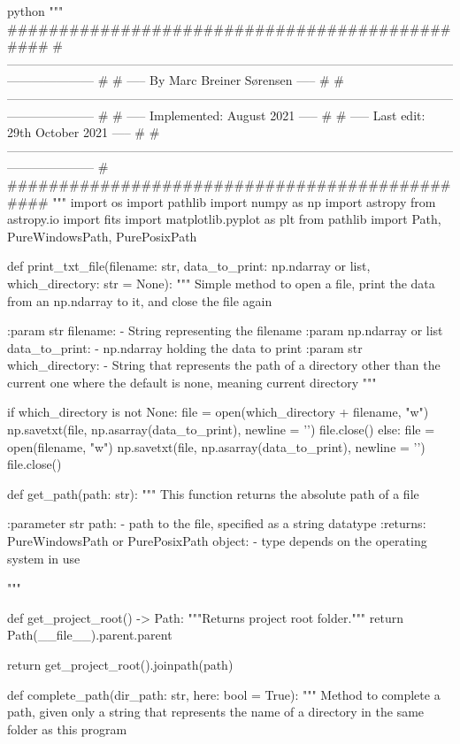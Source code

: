 \documentclass[../main.tex]{subfiles}
\begin{document}
\begin{mintedbox}{python}
"""
###############################################
# --------------------------------------------------------------------------------------------------------------------------------- #
# -----       By Marc Breiner Sørensen        ----- #
# --------------------------------------------------------------------------------------------------------------------------------- #
# ----- Implemented:           August    2021 ----- #
# ----- Last edit:      29th   October   2021 ----- #
# --------------------------------------------------------------------------------------------------------------------------------- #
###############################################
"""
import os
import pathlib
import numpy as np
import astropy
from astropy.io import fits
import matplotlib.pyplot as plt
from pathlib import Path, PureWindowsPath, PurePosixPath


def print_txt_file(filename: str, data_to_print: np.ndarray or list, which_directory: str  =  None):
"""
Simple method to open a file, print the data from an
np.ndarray to it, and close the file again

:param str filename:
- String representing the filename
:param np.ndarray or list data_to_print:
- np.ndarray holding the data to print
:param str which_directory:
- String that represents the path of a directory other than the current one
where the default is none, meaning current directory
"""

if which_directory is not None:
file  =  open(which_directory + filename, "w")
np.savetxt(file, np.asarray(data_to_print), newline = '\n')
file.close()
else:
file  =  open(filename, "w")
np.savetxt(file, np.asarray(data_to_print), newline = '\n')
file.close()

def get_path(path: str):
"""
This function returns the absolute path of a file

:parameter str path:
- path to the file, specified as a string datatype
:returns: PureWindowsPath or PurePosixPath object:
- type depends on the operating system in use

"""

def get_project_root() -> Path:
"""Returns project root folder."""
return Path(__file__).parent.parent

return get_project_root().joinpath(path)


def complete_path(dir_path: str, here: bool  =  True):
"""
Method to complete a path, given only a string that represents
the name of a directory in the same folder as this program


\end{mintedbox}
\end{document}
